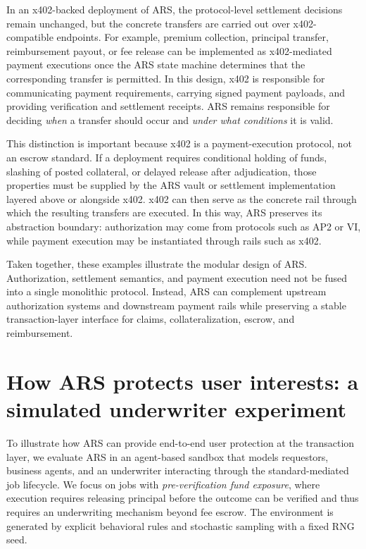 \documentclass{article} %
\begin{document}
In an x402-backed deployment of \textsc{ARS}, the protocol-level settlement decisions remain unchanged, but the concrete transfers are carried out over x402-compatible endpoints. For example, premium collection, principal transfer, reimbursement payout, or fee release can be implemented as x402-mediated payment executions once the \textsc{ARS} state machine determines that the corresponding transfer is permitted. In this design, x402 is responsible for communicating payment requirements, carrying signed payment payloads, and providing verification and settlement receipts. \textsc{ARS} remains responsible for deciding \emph{when} a transfer should occur and \emph{under what conditions} it is valid.

This distinction is important because x402 is a payment-execution protocol, not an escrow standard. If a deployment requires conditional holding of funds, slashing of posted collateral, or delayed release after adjudication, those properties must be supplied by the \textsc{ARS} vault or settlement implementation layered above or alongside x402. x402 can then serve as the concrete rail through which the resulting transfers are executed. In this way, \textsc{ARS} preserves its abstraction boundary: authorization may come from protocols such as AP2 or VI, while payment execution may be instantiated through rails such as x402.

Taken together, these examples illustrate the modular design of \textsc{ARS}. Authorization, settlement semantics, and payment execution need not be fused into a single monolithic protocol. Instead, \textsc{ARS} can complement upstream authorization systems and downstream payment rails while preserving a stable transaction-layer interface for claims, collateralization, escrow, and reimbursement.








\section{How \textsc{ARS} protects user interests: a simulated underwriter experiment}

To illustrate how \textsc{ARS} can provide end-to-end user protection at the transaction layer, we evaluate \textsc{ARS} in an agent-based sandbox that models requestors, business agents, and an underwriter interacting through the standard-mediated job lifecycle. We focus on jobs with \emph{pre-verification fund exposure}, where execution requires releasing principal before the outcome can be verified and thus requires an underwriting mechanism beyond fee escrow. The environment is generated by explicit behavioral rules and stochastic sampling with a fixed RNG seed. 
\end{document}
